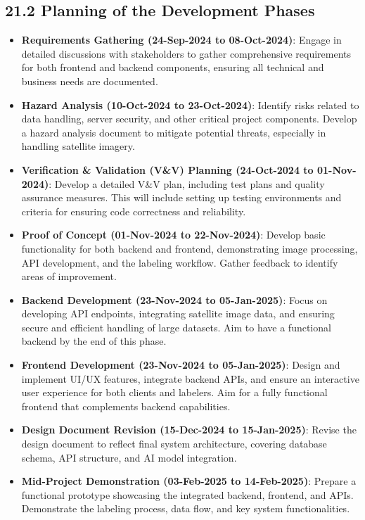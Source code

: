 \documentclass[12pt]{article}
\begin{document}
\subsection*{21.2 Planning of the Development Phases}
\begin{itemize}[leftmargin=2cm]
    \item \textbf{Requirements Gathering (24-Sep-2024 to 08-Oct-2024)}: Engage in detailed discussions with stakeholders to gather comprehensive requirements for both frontend and backend components, ensuring all technical and business needs are documented.
    \item \textbf{Hazard Analysis (10-Oct-2024 to 23-Oct-2024)}: Identify risks related to data handling, server security, and other critical project components. Develop a hazard analysis document to mitigate potential threats, especially in handling satellite imagery.
    \item \textbf{Verification \& Validation (V\&V) Planning (24-Oct-2024 to 01-Nov-2024)}: Develop a detailed V\&V plan, including test plans and quality assurance measures. This will include setting up testing environments and criteria for ensuring code correctness and reliability.
    \item \textbf{Proof of Concept (01-Nov-2024 to 22-Nov-2024)}: Develop basic functionality for both backend and frontend, demonstrating image processing, API development, and the labeling workflow. Gather feedback to identify areas of improvement.
    \item \textbf{Backend Development (23-Nov-2024 to 05-Jan-2025)}: Focus on developing API endpoints, integrating satellite image data, and ensuring secure and efficient handling of large datasets. Aim to have a functional backend by the end of this phase.
    \item \textbf{Frontend Development (23-Nov-2024 to 05-Jan-2025)}: Design and implement UI/UX features, integrate backend APIs, and ensure an interactive user experience for both clients and labelers. Aim for a fully functional frontend that complements backend capabilities.
    \item \textbf{Design Document Revision (15-Dec-2024 to 15-Jan-2025)}: Revise the design document to reflect final system architecture, covering database schema, API structure, and AI model integration.
    \item \textbf{Mid-Project Demonstration (03-Feb-2025 to 14-Feb-2025)}: Prepare a functional prototype showcasing the integrated backend, frontend, and APIs. Demonstrate the labeling process, data flow, and key system functionalities.

\end{itemize}
\end{document}
